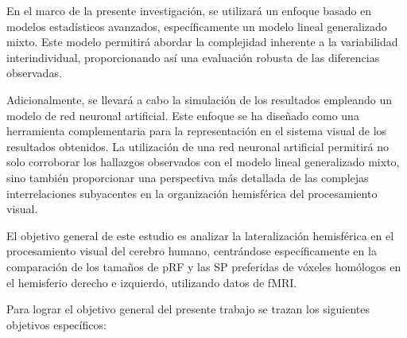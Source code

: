 
En el marco de la presente investigación, se utilizará un enfoque basado en modelos estadísticos avanzados, específicamente un modelo lineal generalizado mixto. Este modelo permitirá abordar la complejidad inherente a la variabilidad interindividual, proporcionando así una evaluación robusta de las diferencias observadas.

Adicionalmente, se llevará a cabo la simulación de los resultados empleando un modelo de red neuronal artificial. Este enfoque se ha diseñado como una herramienta complementaria para la representación en el sistema visual de los resultados obtenidos. La utilización de una red neuronal artificial permitirá no solo corroborar los hallazgos observados con el modelo lineal generalizado mixto, sino también proporcionar una perspectiva más detallada de las complejas interrelaciones subyacentes en la organización hemisférica del procesamiento visual.

El objetivo general de este estudio es analizar la lateralización hemisférica en el procesamiento visual del cerebro humano, centrándose específicamente en la comparación de los tamaños de pRF y las SP preferidas de v\'oxeles hom\'ologos en el hemisferio derecho e izquierdo, utilizando datos de fMRI.

Para lograr el objetivo general del presente trabajo se
trazan los siguientes objetivos específicos:

